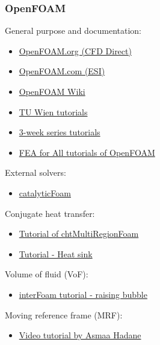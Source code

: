 \subsubsection{OpenFOAM}

\noindent{}General purpose and documentation:
\begin{itemize}
	\item\href{https://openfoam.org/}
	{OpenFOAM.org (CFD Direct)}
	\item\href{https://www.openfoam.com/}
	{OpenFOAM.com (ESI)}
	\item\href{https://openfoamwiki.net/index.php/Main_Page}
	{OpenFOAM Wiki}
	\item\href{https://www.cfd.at/tutorials}
	{TU Wien tutorials}
	\item\href{https://wiki.openfoam.com/index.php?title=%223_weeks%22_series}
	{3-week series tutorials}
	\item\href{https://feaforall.com/category/tutorial/openfoam/}
	{FEA for All tutorials of OpenFOAM}
\end{itemize}

\noindent{}External solvers:
\begin{itemize}
	\item\href{https://github.com/multiscale-catalysis-polimi/catalyticFoam}
	{catalyticFoam}
\end{itemize}

\noindent{}Conjugate heat transfer:
\begin{itemize}
	\item\href{https://www.youtube.com/watch?v=Nhhm-ZPxVRc&list=PLykdptEQ2lFintoU5dgerzQbQprd9zwTY}
	{Tutorial of chtMultiRegionFoam}
	\item\href{https://www.youtube.com/watch?v=MD3cjOF8S60}
	{Tutorial - Heat sink}
\end{itemize}

\noindent{}Volume of fluid (VoF):
\begin{itemize}
	\item\href{https://www.youtube.com/watch?v=JYHhF25OTm0&list=PLykdptEQ2lFintoU5dgerzQbQprd9zwTY&index=2}
	{interFoam tutorial - raising bubble}
\end{itemize}

\noindent{}Moving reference frame (MRF):
\begin{itemize}
	\item\href{https://www.youtube.com/watch?v=KccubqHQS-0}
	{Video tutorial by Asmaa Hadane}
\end{itemize}

